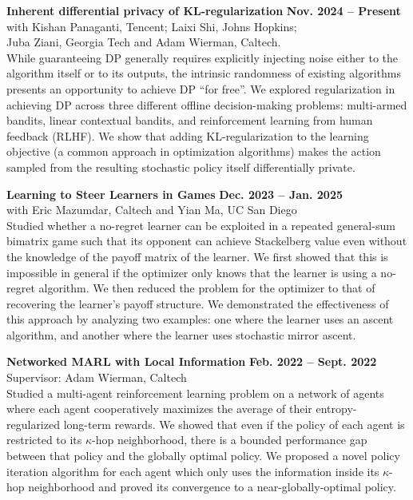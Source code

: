 \documentclass[11pt]{article}
\begin{document}
\begin{list2}
\item[] {\bf Inherent differential privacy of KL-regularization} {\hfill \bf Nov. 2024 -- Present}\\
with Kishan Panaganti, Tencent; Laixi Shi, Johns Hopkins;\\
Juba Ziani, Georgia Tech and Adam Wierman, Caltech. \\
While guaranteeing DP generally requires explicitly injecting noise either to the algorithm itself or to its outputs, the intrinsic randomness of existing algorithms presents an opportunity to achieve DP ``for free''. We explored regularization in achieving DP across three different offline decision-making problems: multi-armed bandits, linear contextual bandits, and reinforcement learning from human feedback (RLHF). We show that adding KL-regularization to the learning objective (a common approach in optimization algorithms) makes the action sampled from the resulting stochastic policy itself differentially private.

\item[] {\bf Learning to Steer Learners in Games} {\hfill \bf Dec. 2023 -- Jan. 2025}\\
with Eric Mazumdar, Caltech and Yian Ma, UC San Diego\\
Studied whether a no-regret learner can be exploited in a repeated general-sum bimatrix game such that its opponent can achieve Stackelberg value even without the knowledge of the payoff matrix of the learner. We first showed that this is impossible in general if the optimizer only knows that the learner is using a no-regret algorithm. We then reduced the problem for the optimizer to that of recovering the learner's payoff structure. We demonstrated the effectiveness of this approach by analyzing two examples: one where the learner uses an ascent algorithm, and another where the learner uses stochastic mirror ascent.

\item[] {\bf Networked MARL with Local Information} {\hfill \bf Feb. 2022 -- Sept. 2022}\\
Supervisor: Adam Wierman, Caltech\\
Studied a multi-agent reinforcement learning problem on a network of agents where each agent cooperatively maximizes the average of their entropy-regularized long-term rewards. We showed that even if the policy of each agent is restricted to its $\kappa$-hop neighborhood, there is a bounded performance gap between that policy and the globally optimal policy. We proposed a novel policy iteration algorithm for each agent which only uses the information inside its $\kappa$-hop neighborhood and proved its convergence to a near-globally-optimal policy.
\end{list2}
\end{document}

